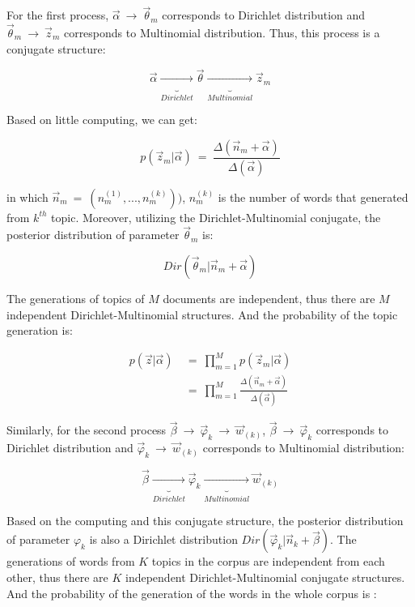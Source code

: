 For the first process, $\vec \alpha\ \rightarrow\ \vec\theta_m$ corresponds to Dirichlet distribution and $\vec\theta_m\ \rightarrow\ \vec z_m$ corresponds to Multinomial distribution. Thus, this process is a conjugate structure:

    $$\vec\alpha \underbrace{\ \longrightarrow\ }_{Dirichlet} \vec\theta \underbrace{\ \longrightarrow\ }_{Multinomial} \vec z_m$$

Based on little computing, we can get:

$$p(\vec z_m|\vec\alpha)\ =\ \frac{\Delta(\vec n_m+\vec\alpha)}{\Delta(\vec\alpha)}$$

in which $\vec n_m\ =\ (n_m^{(1)},...,n_m^{(k)}))$, $n_m^{(k)}$ is the number of words that generated from $k^{th}$ topic. Moreover, utilizing the Dirichlet-Multinomial conjugate, the posterior distribution of parameter $\vec\theta_m$ is:

$$Dir(\vec\theta_m|\vec n_m+\vec\alpha)$$

The generations of topics of $M$ documents are independent, thus there are $M$ independent Dirichlet-Multinomial structures. And the probability of the topic generation is:

\begin{equation}\label{pza}
\begin{aligned}
    p(\vec z|\vec\alpha)\ &=\ \prod_{m=1}^{M}p(\vec z_m|\vec\alpha)\\
    &=\ \prod_{m=1}^{M}\frac{\Delta(\vec n_m+\vec\alpha)}{\Delta(\vec\alpha)}
\end{aligned}
\end{equation}

Similarly, for the second process $\vec\beta\ \rightarrow\ \vec\varphi_k\ \rightarrow\ \vec w_{(k)}$, $\vec\beta\ \rightarrow\ \vec\varphi_k$ corresponds to Dirichlet distribution and $\vec\varphi_k\ \rightarrow\ \vec w_{(k)}$ corresponds to Multinomial distribution:

   $$\vec\beta \underbrace{\ \longrightarrow\ }_{Dirichlet} \vec\varphi_k \underbrace{\ \longrightarrow\ }_{Multinomial} \vec w_{(k)}$$

Based on the computing and this conjugate structure, the posterior distribution of parameter $\varphi_k$ is also a Dirichlet distribution $Dir(\vec\varphi_k|\vec n_k+\vec\beta)$. The generations of words from $K$ topics in the corpus are independent from each other, thus there are $K$ independent Dirichlet-Multinomial conjugate structures. And the probability of the generation of the words in the whole corpus is \cite{heinrich2005parameter}:

